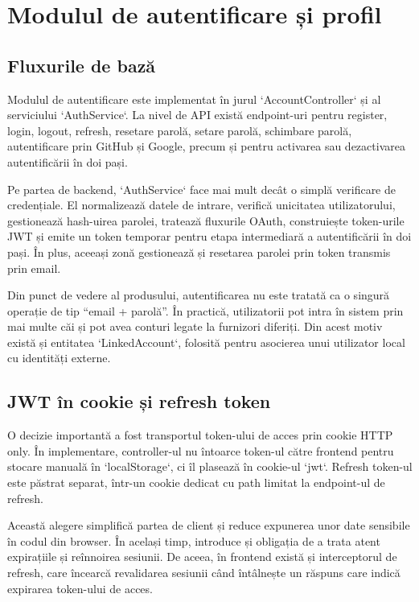 \section{Modulul de autentificare și profil}

\subsection{Fluxurile de bază}

Modulul de autentificare este implementat în jurul `AccountController` și al serviciului `AuthService`. La nivel de API există endpoint-uri pentru register, login, logout, refresh, resetare parolă, setare parolă, schimbare parolă, autentificare prin GitHub și Google, precum și pentru activarea sau dezactivarea autentificării în doi pași.

Pe partea de backend, `AuthService` face mai mult decât o simplă verificare de credențiale. El normalizează datele de intrare, verifică unicitatea utilizatorului, gestionează hash-uirea parolei, tratează fluxurile OAuth, construiește token-urile JWT și emite un token temporar pentru etapa intermediară a autentificării în doi pași. În plus, aceeași zonă gestionează și resetarea parolei prin token transmis prin email.

Din punct de vedere al produsului, autentificarea nu este tratată ca o singură operație de tip ``email + parolă''. În practică, utilizatorii pot intra în sistem prin mai multe căi și pot avea conturi legate la furnizori diferiți. Din acest motiv există și entitatea `LinkedAccount`, folosită pentru asocierea unui utilizator local cu identități externe.

\subsection{JWT în cookie și refresh token}

O decizie importantă a fost transportul token-ului de acces prin cookie HTTP only. În implementare, controller-ul nu întoarce token-ul către frontend pentru stocare manuală în `localStorage`, ci îl plasează în cookie-ul `jwt`. Refresh token-ul este păstrat separat, într-un cookie dedicat cu path limitat la endpoint-ul de refresh.

Această alegere simplifică partea de client și reduce expunerea unor date sensibile în codul din browser. În același timp, introduce și obligația de a trata atent expirațiile și reînnoirea sesiunii. De aceea, în frontend există și interceptorul de refresh, care încearcă revalidarea sesiunii când întâlnește un răspuns care indică expirarea token-ului de acces.

